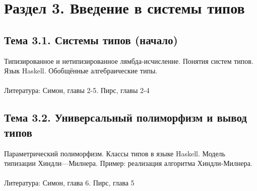 \documentclass[a4paper,11pt]{article}
\begin{document}
\section*{Раздел 3. Введение в системы типов}

\subsection*{Тема 3.1. Системы типов (начало)}
Типизированное и нетипизированное лямбда-исчисление. Понятия систем типов.
Язык Haskell. Обобщённые алгебраические типы.
\\\\
Литература: Симон, главы 2-5. Пирс, главы 2-4

\subsection*{Тема 3.2. Универсальный полиморфизм и вывод типов}
Параметрический полиморфизм. Классы типов в языке Haskell. Модель типизации
Хиндли—Милнера. Пример: реализация алгоритма Хиндли-Милнера.
\\\\
Литература: Симон, глава 6. Пирс, глава 5
\end{document}
